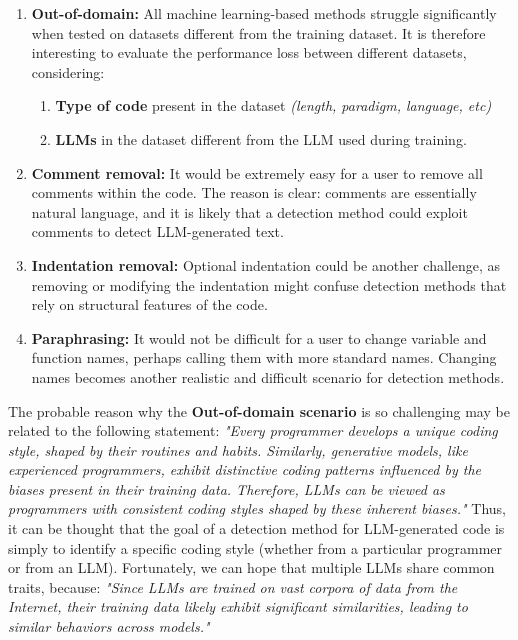 \begin{enumerate}
\item \textbf{Out-of-domain:} All machine learning-based methods struggle significantly 
when tested on datasets different from the training dataset. It is therefore 
interesting to evaluate the performance loss between different datasets, considering:
    \begin{enumerate}
    \item \textbf{Type of code} present in the dataset \textit{(length, paradigm, language, etc)}
    \item \textbf{LLMs} in the dataset different from the LLM used during training.
    \end{enumerate}
\item \textbf{Comment removal:} It would be extremely easy for a user to remove all 
comments within the code. The reason is clear: comments are essentially 
natural language, and it is likely that a detection method could exploit 
comments to detect LLM-generated text.

\item \textbf{Indentation removal:} Optional indentation could be another challenge, 
as removing or modifying the indentation might confuse detection methods 
that rely on structural features of the code.

\item \textbf{Paraphrasing:} It would not be difficult for a user to change variable and 
function names, perhaps calling them with more standard names. 
Changing names becomes another realistic and difficult scenario for detection methods.
\end{enumerate}

The probable reason why the \textbf{Out-of-domain scenario} is so challenging 
may be related to the following statement:
\textit{"Every programmer develops a unique coding style, shaped by their 
routines and habits. Similarly, generative models, like experienced 
programmers, exhibit distinctive coding patterns influenced by the 
biases present in their training data. Therefore, LLMs can be viewed 
as programmers with consistent coding styles shaped by these inherent biases."}
\cite{ye2023uncovering}
Thus, it can be thought that the goal of a detection method for 
LLM-generated code is simply to identify a specific coding style 
(whether from a particular programmer or from an LLM). Fortunately, 
we can hope that multiple LLMs share common traits, because:
\textit{"Since LLMs are trained on vast corpora of data from the Internet, 
their training data likely exhibit significant similarities, leading 
to similar behaviors across models."}\cite{guo2024biscope}